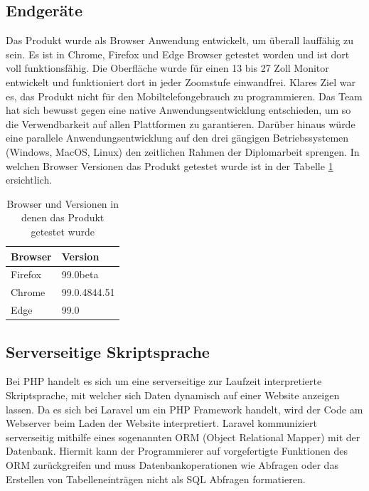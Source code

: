 \subsection{Endgeräte}
Das Produkt wurde als Browser Anwendung entwickelt, um überall lauffähig zu sein. Es ist in Chrome, Firefox und Edge Browser getestet worden und ist dort voll funktionsfähig. Die Oberfläche wurde für einen 13 bis 27 Zoll Monitor entwickelt und funktioniert dort in jeder Zoomstufe einwandfrei. Klares Ziel war es, das Produkt nicht für den Mobiltelefongebrauch zu programmieren. Das Team hat sich bewusst gegen eine native Anwendungsentwicklung entschieden, um so die Verwendbarkeit auf allen Plattformen zu garantieren. Darüber hinaus würde eine parallele Anwendungsentwicklung auf den drei gängigen Betriebssystemen (Windows, MacOS, Linux) den zeitlichen Rahmen der Diplomarbeit sprengen. In welchen Browser Versionen das Produkt getestet wurde ist in der Tabelle \ref{tab:Browser und Versionen in denen das Produkt getestet wurde} ersichtlich. 

\newpage
\begin{table}[h]

	\begin{tabular}{|l|l|}
		\hline
		Browser & Version      \\ \hline
		Firefox & 99.0beta     \\ \hline
		Chrome  & 99.0.4844.51 \\ \hline
		Edge    & 99.0         \\ \hline
	\end{tabular}
\caption{Browser und Versionen in denen das Produkt getestet wurde}
\label{tab:Browser und Versionen in denen das Produkt getestet wurde}
\end{table}


\subsection{Serverseitige Skriptsprache }
Bei PHP handelt es sich um eine serverseitige zur Laufzeit interpretierte Skriptsprache, mit welcher sich Daten dynamisch auf einer Website anzeigen lassen. Da es sich bei Laravel um ein PHP Framework handelt, wird der Code am Webserver beim Laden der Website interpretiert. Laravel kommuniziert serverseitig mithilfe eines sogenannten ORM (Object Relational Mapper) mit der Datenbank. Hiermit kann der Programmierer auf vorgefertigte Funktionen des ORM zurückgreifen und muss Datenbankoperationen wie Abfragen oder das Erstellen von Tabelleneinträgen nicht als SQL Abfragen formatieren.

